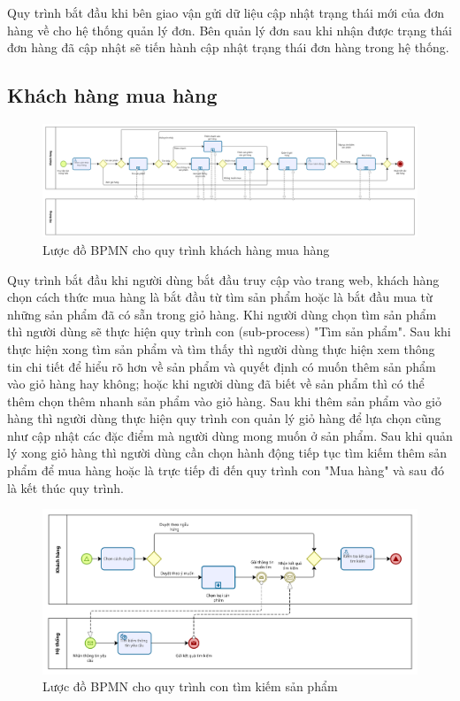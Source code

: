 Quy trình bắt đầu khi bên giao vận gửi dữ liệu cập nhật trạng thái mới của đơn hàng về cho hệ thống quản lý đơn. Bên quản lý đơn sau khi nhận được trạng thái đơn hàng đã cập nhật sẽ tiến hành cập nhật trạng thái đơn hàng trong hệ thống.

\newpage

\subsection{Khách hàng mua hàng}
\begin{figure}[!htp]
    \centering
    \includegraphics[width=17cm]{img/BPMN/customer_buy/customer_buy.png}
    \newline
    \caption{Lược đồ BPMN cho quy trình khách hàng mua hàng}
\end{figure}
 
Quy trình bắt đầu khi người dùng bắt đầu truy cập vào trang web, khách hàng chọn cách thức mua hàng là bắt đầu từ tìm sản phẩm hoặc là bắt đầu mua từ những sản phẩm đã có sẵn trong giỏ hàng. Khi người dùng chọn tìm sản phẩm thì người dùng sẽ thực hiện quy trình con (sub-process) "Tìm sản phẩm". Sau khi thực hiện xong tìm sản phẩm và tìm thấy thì người dùng thực hiện xem thông tin chi tiết để hiểu rõ hơn về sản phẩm và quyết định có muốn thêm sản phẩm vào giỏ hàng hay không; hoặc khi người dùng đã biết về sản phẩm thì có thể thêm chọn thêm nhanh sản phẩm vào giỏ hàng. Sau khi thêm sản phẩm vào giỏ hàng thì người dùng thực hiện quy trình con quản lý giỏ hàng để lựa chọn cũng như cập nhật các đặc điểm mà người dùng mong muốn ở sản phẩm. Sau khi quản lý xong giỏ hàng thì người dùng cần chọn hành động tiếp tục tìm kiếm thêm sản phẩm để mua hàng hoặc là trực tiếp đi đến quy trình con "Mua hàng" và sau đó là kết thúc quy trình.
 
 
\begin{figure}[!htp]
    \centering
    \includegraphics[width=13cm]{img/BPMN/customer_buy/customer_search_product.png}
    \newline
    \caption{Lược đồ BPMN cho quy trình con tìm kiếm sản phẩm}
\end{figure}
 
